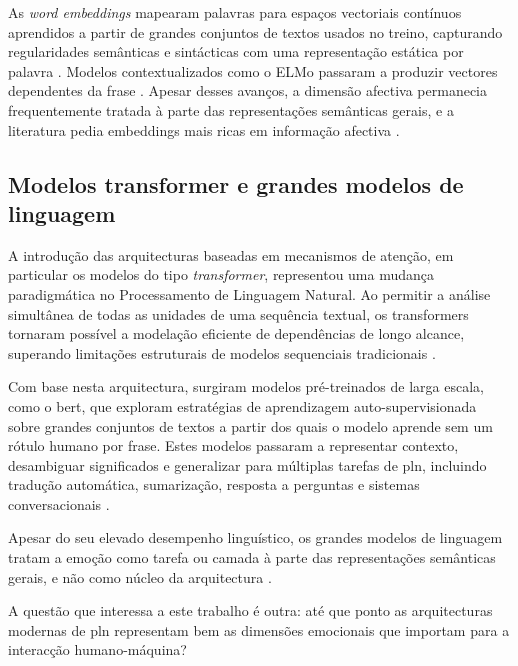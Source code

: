 As \textit{word embeddings} mapearam palavras para espaços vectoriais contínuos aprendidos a partir de grandes conjuntos de textos usados no treino, capturando regularidades semânticas e sintácticas com uma representação estática por palavra \parencite{Young2018Trends}. Modelos contextualizados como o ELMo passaram a produzir vectores dependentes da frase \parencite{Peters2018ELMo}. Apesar desses avanços, a dimensão afectiva permanecia frequentemente tratada à parte das representações semânticas gerais, e a literatura pedia embeddings mais ricas em informação afectiva \parencite{BuechelEtAl2021Embeddings, PlazaDelArco2024Trends, Seyeditabari2018Review}.

\subsection{Modelos transformer e grandes modelos de linguagem}
\label{subsec:transformers}

A introdução das arquitecturas baseadas em mecanismos de atenção, em particular os modelos do tipo \textit{transformer}, representou uma mudança paradigmática no Processamento de Linguagem Natural. Ao permitir a análise simultânea de todas as unidades de uma sequência textual, os transformers tornaram possível a modelação eficiente de dependências de longo alcance, superando limitações estruturais de modelos sequenciais tradicionais \parencite{Vaswani2017Attention}.

Com base nesta arquitectura, surgiram modelos pré-treinados de larga escala, como o \gls{bert}, que exploram estratégias de aprendizagem auto-supervisionada sobre grandes conjuntos de textos a partir dos quais o modelo aprende sem um rótulo humano por frase. Estes modelos passaram a representar contexto, desambiguar significados e generalizar para múltiplas tarefas de \gls{pln}, incluindo tradução automática, sumarização, resposta a perguntas e sistemas conversacionais \parencite{Devlin2019BERT}.

Apesar do seu elevado desempenho linguístico, os grandes modelos de linguagem tratam a emoção como tarefa ou camada à parte das representações semânticas gerais, e não como núcleo da arquitectura \parencite{PlazaDelArco2024Trends, Seyeditabari2018Review}.

A questão que interessa a este trabalho é outra: até que ponto as arquitecturas modernas de \gls{pln} representam bem as dimensões emocionais que importam para a interacção humano-máquina?


